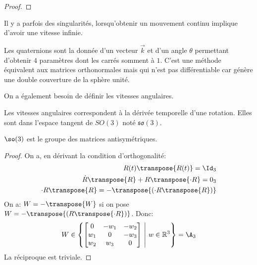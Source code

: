 \documentclass[math]{cours}
\begin{document}
\begin{proof}

\end{proof}

Il y a parfois des singularités, lorsqu'obtenir un mouvement continu implique d'avoir une vitesse infinie.

\begin{definition}
	Les quaternions sont la donnée d'un vecteur $\vec{k}$ et d'un angle $\theta$ permettant d'obtenir $4$ paramètres dont les carrés somment à $1$.
	C'est une méthode équivalent aux matrices orthonormales mais qui n'est pas différentiable car génère une double couverture de la sphère unité.
	\label{def:quaternions}
\end{definition}

On a également besoin de définir les vitesses angulaires.
\begin{definition}
	Les vitesses angulaires correspondent à la dérivée temporelle d'une rotation.
	Elles sont dans l'espace tangent de $SO(3)$ noté $\mathfrak{so}(3)$.
	\label{}
\end{definition}

\begin{thm}
	$\so(3)$ est le groupe des matrices antisymétriques.
	\label{prop:so3}
\end{thm}

\begin{proof}
	On a, en dérivant la condition d'orthogonalité:
	\begin{align*}
		R(t)\transpose{R(t)} = \Id_{3}                       \\
		\dot{R}\transpose{R} + R\transpose{\cdot{R}} = 0_{3} \\
		\cdot{R}\transpose{R} = -\transpose{\left(\cdot{R}\transpose{R}\right)}
	\end{align*}
	On a: $W = -\transpose{W}$ si on pose $W = -\transpose{\left(R\transpose{\cdot{R}}\right)}$.
	Donc:
	\begin{equation*}
		W \in \left\{ \begin{bmatrix}
			0     & -w_{1} & -w_{2} \\
			w_{1} & 0      & -w_{3} \\
			w_{2} & w_{3}  & 0
		\end{bmatrix}\ \middle|\ w \in \R^{3}\right\} = \A_{3}
	\end{equation*}
	La réciproque est triviale.
\end{proof}
\end{document}
